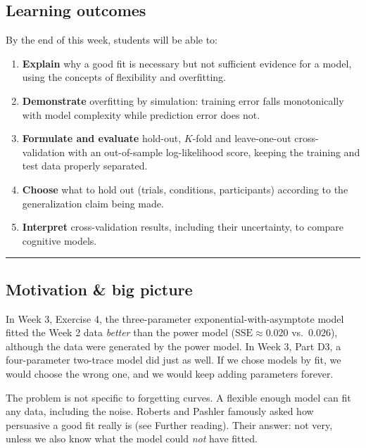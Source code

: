 \subsection{Learning outcomes}

By the end of this week, students will be able to:

\begin{enumerate}
\def\labelenumi{\arabic{enumi}.}
\tightlist
\item
  \textbf{Explain} why a good fit is necessary but not sufficient
  evidence for a model, using the concepts of flexibility and
  overfitting.
\item
  \textbf{Demonstrate} overfitting by simulation: training error falls
  monotonically with model complexity while prediction error does not.
\item
  \textbf{Formulate and evaluate} hold-out, \(K\)-fold and leave-one-out
  cross-validation with an out-of-sample log-likelihood score, keeping
  the training and test data properly separated.
\item
  \textbf{Choose} what to hold out (trials, conditions, participants)
  according to the generalization claim being made.
\item
  \textbf{Interpret} cross-validation results, including their
  uncertainty, to compare cognitive models.
\end{enumerate}

\begin{center}\rule{0.5\linewidth}{0.5pt}\end{center}

\subsection{Motivation \& big picture}

In Week 3, Exercise 4, the three-parameter exponential-with-asymptote
model fitted the Week 2 data \emph{better} than the power model
(\(\mathrm{SSE} \approx 0.020\) vs.~\(0.026\)), although the data were
generated by the power model. In Week 3, Part D3, a four-parameter
two-trace model did just as well. If we chose models by fit, we would
choose the wrong one, and we would keep adding parameters forever.

The problem is not specific to forgetting curves. A flexible enough
model can fit any data, including the noise. Roberts and Pashler
famously asked how persuasive a good fit really is (see Further
reading). Their answer: not very, unless we also know what the model
could \emph{not} have fitted.

